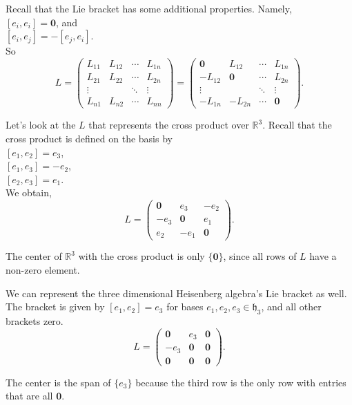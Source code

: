 \documentclass[11 pt]{article}
\newcommand{\br}[2]{\left[#1,#2\right]}
\newcommand{\h}{\lal{h}}
\newcommand{\lal}[1]{\mathfrak{#1}}
\newcommand{\zvec}{\mathbf{0}}
\newcommand{\RR}{\mathbb{R}}
\begin{document}
    Recall that the Lie bracket has some additional properties.  Namely,
    \\$[e_i,e_i] = \zvec$, and
    \\$[e_i, e_j] = -[e_j, e_i]$.
    \\So
    $$
     L = \begin{pmatrix}
        L_{11} & L_{12} & \cdots & L_{1n} \\
        L_{21} & L_{22} & \cdots & L_{2n} \\
        \vdots &        & \ddots & \vdots \\
        L_{n1} & L_{n2} & \cdots & L_{nn}
    \end{pmatrix}
    = \begin{pmatrix}
               \zvec& L_{12}  & \cdots & L_{1n} \\
               -L_{12}& \zvec & \cdots & L_{2n} \\
               \vdots &       & \ddots & \vdots \\
               -L_{1n}&-L_{2n}& \cdots & \zvec
        \end{pmatrix}.
    $$
    \pagebreak
    \begin{example}
    Let's look at the $L$ that represents the cross product over $\RR^3$.
    Recall that the cross product is defined on the basis by
        \\$\br{e_1}{e_2}=e_3$,
        \\$\br{e_1}{e_3}=-e_2$,
        \\$\br{e_2}{e_3}=e_1$.
        \\We obtain,
        $$
        L = \begin{pmatrix}
              \zvec & e_3   & -e_2
            \\-e_3  & \zvec & e_1
            \\e_2   & -e_1  & \zvec
        \end{pmatrix}.
    $$
    \end{example}
    The center of $\RR^3$ with the cross product is only $\{\zvec\}$, since all
    rows of $L$ have a non-zero element.
    \begin{example}
    We can represent the three dimensional Heisenberg algebra's Lie bracket as
    well. The bracket is given by $\br{e_1}{e_2}=e_3$ for bases
    $e_1, e_2, e_3 \in \h_3$, and all other
        brackets zero.
    $$
    L = \begin{pmatrix}
          \zvec & e_3   & \zvec
        \\-e_3  & \zvec & \zvec
        \\\zvec & \zvec & \zvec
    \end{pmatrix}.
    $$
    \end{example}
    The center is the span of $\{e_3\}$ because the third row is the only row
    with entries that are all $\zvec$.
\end{document}

